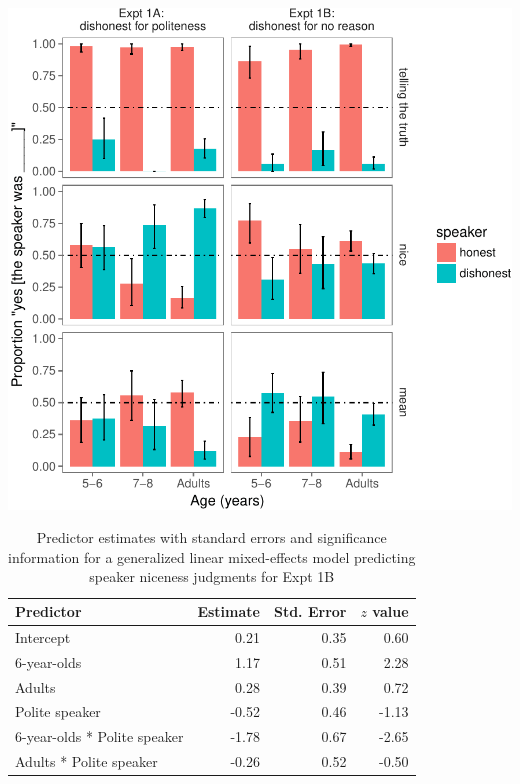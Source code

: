 \documentclass[a4paper,man,apacite,floatsintext]{apa6}
\newenvironment{CodeChunk}{}{}
\begin{document}
\begin{CodeChunk}

\includegraphics{figs/unnamed-chunk-6-1} \end{CodeChunk}

\begin{table}[h]
\centering
\begin{tabular}{lrrr}
 Predictor & Estimate & Std. Error & $z$ value \\ 
  \hline
Intercept & 0.21 & 0.35 & 0.60 \\ 
  6-year-olds & 1.17 & 0.51 & 2.28 \\ 
  Adults & 0.28 & 0.39 & 0.72 \\ 
  Polite speaker & -0.52 & 0.46 & -1.13 \\ 
  6-year-olds * Polite speaker & -1.78 & 0.67 & -2.65 \\ 
  Adults * Polite speaker & -0.26 & 0.52 & -0.50 \\ 
   \hline
\end{tabular}
\caption{Predictor estimates with standard errors and significance information for a generalized linear mixed-effects model predicting speaker niceness judgments for Expt 1B} 
\label{tab:1b_mean_tab}
\end{table}
\end{document}
